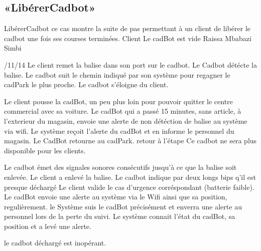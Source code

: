 \subsection{«LibérerCadbot»}
\startCU
\nom LibérerCadbot
\but ce cas montre la suite de pas permettant à un client de libérer le cadbot une fois ses courses terminées.
\acteur Client
\precondition Le cadBot est vide
\auteur Raissa Mbabazi Simbi
\date 7/11/14
\nominal %
\startnominal
\etape[LC:SA1] Le client remet la balise dans son port sur le cadbot.
\etape[LC:SA2] Le Cadbot détécte la balise.
\etape[LC:RETOUR] Le cadbot suit le chemin indiqué par son système pour regagner le cadPark le plus proche.
\stopnominal
\postcondition Le cadbot s'éloigne du client.
\alternatifs
\startalternatif[LC:SA1] %

\etape Le client pousse la cadBot, un peu plus loin pour pouvoir quitter le centre commercial avec sa voiture.
\etape Le cadBot qui a passé 15 minutes, sans article, à l'exterieur du magasin, envoie une alerte de non détéction de balise au système via wifi.
\etape Le système reçoit l'alerte du cadBot et en informe le personnel du magasin.
\etape Le CadBot retourne au cadPark.
\etape retour à l'étape \in[LC:RETOUR]
\stopcondition
\postcondition Ce cadbot ne sera plus disponible pour les clients.
\stopalternatif

\startalternatif[LC:SA1] %
\etape Le cadbot émet des signales sonores consécutifs jusqu'à ce que la balise soit enlevée.
\stopcondition
\postcondition Le client a enlevé la balise.
\stopalternatif
\startalternatif[LC:SA2] %
\etape Le cadbot indique par deux longs bips  q'il est presque déchargé
\etape Le client valide le cas d'urgence corréspondant (batterie faible).
\etape Le cadBot envoie une alerte au système via le Wifi ainsi que sa position, regulièrement.
\etape le Système suis le cadBot précisément et enverra une alerte au personnel lors de la perte du suivi.
\stopcondition
\postcondition Le système connait l'état du cadBot, sa position et a levé une alerte.
\stopalternatif


\exception
le cadbot déchargé est inopérant.
\stopCU

